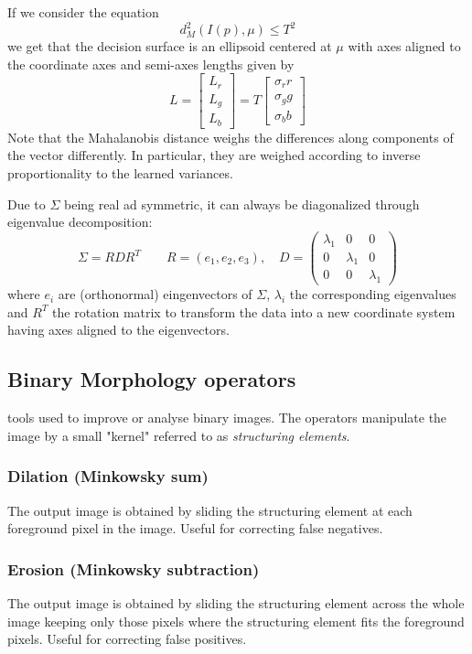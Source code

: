 \documentclass{article}
\begin{document}
If we consider the equation 
\[
    d_M^2(I(p),\mu) \leq T^2
\]
we get that the decision surface is an ellipsoid centered at $\mu$ with axes aligned to the coordinate axes and semi-axes lengths given by
\[
    L=\begin{bmatrix}
        L_r \\ L_g \\ L_b
    \end{bmatrix} = T \begin{bmatrix}
        \sigma_rr \\\sigma_gg \\\sigma_bb 
    \end{bmatrix}
\]
Note that the Mahalanobis distance weighs the differences along components of the vector differently. In particular, they are weighed according to inverse proportionality to the learned variances.

Due to $\Sigma$ being real ad symmetric, it can always be diagonalized through eigenvalue decomposition:
\[
    \Sigma = RDR^T \qquad R=(e_1,e_2,e_3), \quad D= \begin{pmatrix}
        \lambda_1 & 0 & 0\\
        0 & \lambda_1 & 0\\
        0 & 0 & \lambda_1
    \end{pmatrix}
\]
where $e_i$ are (orthonormal) eingenvectors of $\Sigma$, $\lambda_i$ the corresponding eigenvalues and $R^T$ the rotation matrix to transform the data into a new coordinate system having axes aligned to the eigenvectors. 
\subsection{Binary Morphology operators}
tools used to improve or analyse binary images. The operators manipulate the image by a small "kernel" referred to as \emph{structuring elements}.
\subsubsection{Dilation (Minkowsky sum)}
The output image is obtained by sliding the structuring element at each foreground pixel in the image. Useful for correcting false negatives.
\subsubsection{Erosion (Minkowsky subtraction)}
The output image is obtained by sliding the structuring element across the whole image keeping only those pixels where the structuring element fits the foreground pixels. Useful for correcting false positives.
\end{document}
